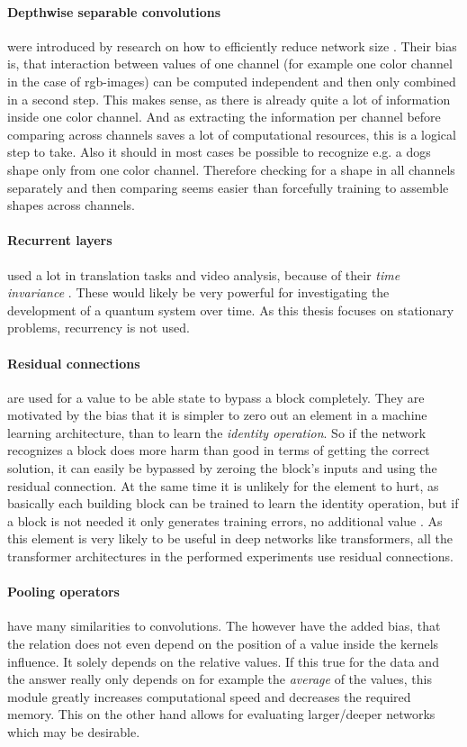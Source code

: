 \paragraph{Depthwise separable convolutions} were introduced by research on how to efficiently reduce network size \cite{mobileNetPaper}.
Their bias is, that interaction between values of one channel (for example one color channel in the case of rgb-images) can be computed independent and then only combined in a second step.
This makes sense, as there is already quite a lot of information inside one color channel. 
And as extracting the information per channel before comparing across channels saves a lot of computational resources, this is a logical step to take.
Also it should in most cases be possible to recognize e.g. a dogs shape only from one color channel. 
Therefore checking for a shape in all channels separately and then comparing seems easier than forcefully training to assemble shapes across channels.

\paragraph{Recurrent layers} used a lot in translation tasks and video analysis, because of their \emph{time invariance} \cite{relationalInductiveBiasesAndGraphNetworks}. 
These would likely be very powerful for investigating the development of a quantum system over time. 
As this thesis focuses on stationary problems, recurrency is not used.

\paragraph{Residual connections} are used for a value to be able state to bypass a block completely.
They are motivated by the bias that it is simpler to zero out an element in a machine learning architecture, than to learn the \emph{identity operation}. 
So if the network recognizes a block does more harm than good in terms of getting the correct solution, it can easily be bypassed by zeroing the block's inputs and using the residual connection. 
At the same time it is unlikely for the element to hurt, as basically each building block can be trained to learn the identity operation, but if a block is not needed it only generates training errors, no additional value \cite{deepResidualLearningForImageRecognition}.
As this element is very likely to be useful in deep networks like transformers, all the transformer architectures in the performed experiments use residual connections.

\paragraph{Pooling operators} have many similarities to convolutions. The however have the added bias, that the relation does not even depend on the position of a value inside the kernels influence. 
It solely depends on the relative values. 
If this true for the data and the answer really only depends on for example the \emph{average} of the values, this module greatly increases computational speed and decreases the required memory.
This on the other hand allows for evaluating larger/deeper networks which may be desirable.